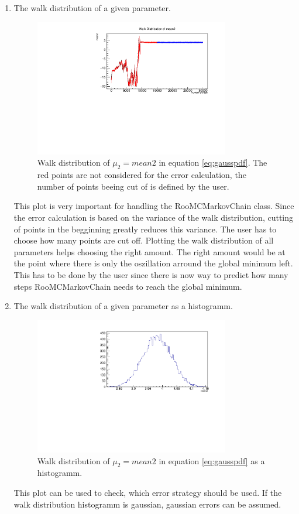 \documentclass[english]{uzhpub}
\begin{document}
\begin{enumerate}
  \item The walk distribution of a given parameter.
  \begin{figure}[H]
    \centering
    \includegraphics[width=0.8\textwidth]{RooMCMC/walkDis}
    \caption{Walk distribution of $\mu_2 = mean2$ in equation \ref{eq:gausspdf}. The red points are not considered for the error calculation, the number of points beeing cut of is defined by the user.}
    \label{fig:walkDis}
  \end{figure}
  This plot is very important for handling the RooMCMarkovChain class. Since the error calculation is based on the variance of the walk distribution, cutting of points in the begginning greatly reduces this variance. The user has to choose how many points are cut off. Plotting the walk distribution of all parameters helps choosing the right amount. The right amount would be at the point where there is only the oszillation arround the global minimum left. This has to be done by the user since there is now way to predict how many steps RooMCMarkovChain needs to reach the global minimum. \\

  \item The walk distribution of a given parameter as a histogramm.
  \begin{figure}[H]
    \centering
    \includegraphics[width=0.8\textwidth]{RooMCMC/walkDisHis}
    \caption{Walk distribution of $\mu_2 = mean2$ in equation \ref{eq:gausspdf} as a histogramm.}
    \label{fig:walkDisHis}
  \end{figure}
  This plot can be used to check, which error strategy should be used. If the walk distribution histogramm is gaussian, gaussian errors can be assumed. \\


\end{enumerate}
\end{document}
